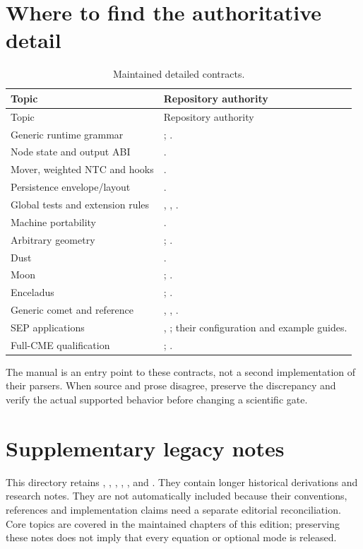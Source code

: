 \section{Where to find the authoritative detail}
\begin{longtable}{L{0.31\textwidth}L{0.59\textwidth}}
\caption{Maintained detailed contracts.}\\
\toprule Topic & Repository authority\\\midrule\endfirsthead
\toprule Topic & Repository authority\\\midrule\endhead
Generic runtime grammar & ;
.\\
Node state and output ABI & .\\
Mover, weighted NTC and hooks & .\\
Persistence envelope/layout & .\\
Global tests and extension rules & ,
, .\\
Machine portability & .\\
Arbitrary geometry & ;
.\\
Dust & .\\
Moon & ; .\\
Enceladus & ;
.\\
Generic comet and reference & ,
,
.\\
SEP applications & , ;
their configuration and example guides.\\
Full-CME qualification & ;
.\\
\bottomrule
\end{longtable}
The manual is an entry point to these contracts, not a second implementation
of their parsers. When source and prose disagree, preserve the discrepancy
and verify the actual supported behavior before changing a scientific gate.

\section{Supplementary legacy notes}
This directory retains , , ,
, ,
 and . They contain longer historical
derivations and research notes. They are not automatically included because
their conventions, references and implementation claims need a separate
editorial reconciliation. Core topics are covered in the maintained chapters
of this edition; preserving these notes does not imply that every equation
or optional mode is released.

